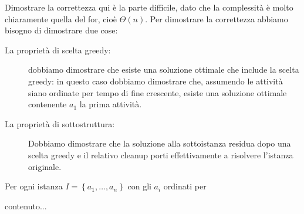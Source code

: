 \documentclass[11pt]{scrartcl}
\newcommand{\bigtheta}[1]{\Theta\!\left(#1\right)}
\begin{document}
	Dimostrare la correttezza qui è la parte difficile, dato che la complessità è molto chiaramente quella del for, cioè $\bigtheta{n}$. Per dimostrare la correttezza abbiamo bisogno di dimostrare due cose:
	\begin{description}
		\item[La proprietà di scelta greedy:] dobbiamo dimostrare che esiste una soluzione ottimale che include la scelta greedy: in questo caso dobbiamo dimostrare che, assumendo le attività siano ordinate per tempo di fine crescente, esiste una soluzione ottimale contenente $a_1$ la prima attività.
		\item[La proprietà di sottostruttura:] Dobbiamo dimostrare che la soluzione alla sottoistanza residua dopo una scelta greedy e il relativo cleanup porti effettivamente a risolvere l'istanza originale.
	\end{description}
	\begin{lemma}
		Per ogni istanza $I=\left\{a_1,\dots,a_n\right\}$ con gli $a_i$ ordinati per  
	\end{lemma}
	\begin{lemma}
		contenuto...
	\end{lemma}
\end{document}
